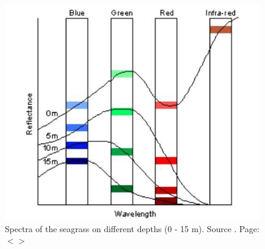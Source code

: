 \documentclass[11pt]{article}
\begin{document}
\begin{figure}
	\centering
	\includegraphics[scale=0.25]{Fig-1-9.jpg}
	\caption{Spectra of the seagrass on different depths (0 - 15 m). Source \cite{Edwards00}\label{Edwards00}. Page: $<$\pageref{page-7}$>$}
	\label{fig:9}
\end{figure}
\end{document}
